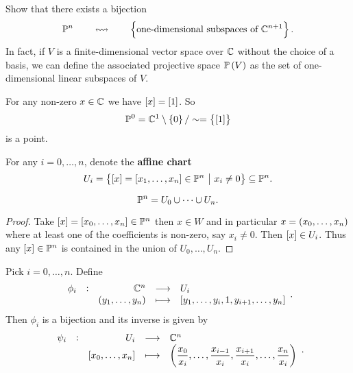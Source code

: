 \begin{exercise**}
Show that there exists a bijection
$$ \PP^n \qquad \leftrightsquigarrow \qquad \cbr{\text{one-dimensional subspaces of} \ \CC^{n + 1}}. $$
In fact, if $ V $ is a finite-dimensional vector space over $ \mathbb{C} $ without the choice of a basis, we can define the associated projective space $ \PP\br{V} $ as the set of one-dimensional linear subspaces of $ V $.
\end{exercise**}

\begin{example}
For any non-zero $ x \in \mathbb{C} $ we have $ \sbr{x} = \sbr{1} $. So
$$ \PP^0 = \CC^1 \setminus \cbr{0} / \sim = \cbr{\sbr{1}} $$
is a point.
\end{example}

\begin{notation}
For any $ i = 0, \dots, n $, denote the \textbf{affine chart}
$$ U_i = \cbr{\sbr{x} = \sbr{x_1, \dots, x_n} \in \PP^n \st x_i \ne 0} \subseteq \PP^n. $$
\end{notation}

\begin{lemma}
\label{lem:3.9}
$$ \mathbb{P}^n = U_0 \cup \dots \cup U_n. $$
\end{lemma}

\begin{proof}
Take $ \sbr{x} = \sbr{x_0, \dots, x_n} \in \PP^n $ then $ x \in W $ and in particular $ x = \br{x_0, \dots, x_n} $ where at least one of the coefficients is non-zero, say $ x_i \ne 0 $. Then $ \sbr{x} \in U_i $. Thus any $ \sbr{x} \in \PP^n $ is contained in the union of $ U_0, \dots, U_n $.
\end{proof}

\pagebreak

\begin{lemma}
\label{lem:3.10}
Pick $ i = 0, \dots, n $. Define
$$ \function[\phi_i]{\CC^n}{U_i}{\br{y_1, \dots, y_n}}{\sbr{y_1, \dots, y_i, 1, y_{i + 1}, \dots, y_n}}. $$
Then $ \phi_i $ is a bijection and its inverse is given by
$$ \function[\psi_i]{U_i}{\CC^n}{\sbr{x_0, \dots, x_n}}{\br{\dfrac{x_0}{x_i}, \dots, \dfrac{x_{i - 1}}{x_i}, \dfrac{x_{i + 1}}{x_i}, \dots, \dfrac{x_n}{x_i}}}. $$
\end{lemma}

